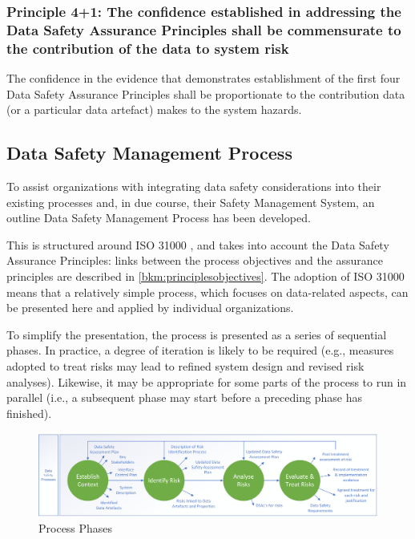 \subsubsection{Principle 4+1: The confidence established in addressing the Data Safety Assurance Principles shall be commensurate to the contribution of the data to system risk}
The confidence in the evidence that demonstrates establishment of the first four Data Safety Assurance Principles shall be proportionate to the contribution data (or a particular data artefact) makes to the system hazards.

\cbstart\subsection{Data Safety Management Process}
To assist organizations with integrating data safety considerations into their existing processes and,
in due course, their Safety Management System, an outline Data Safety Management Process has
been developed.

This is structured around ISO 31000 \cite{citation:iso310002018risk}, and takes into account the Data Safety Assurance Principles:
links between the process objectives and the assurance principles are described in \autoref{bkm:principlesobjectives}. The
adoption of ISO 31000 means that a relatively simple process, which focuses on data-related
aspects, can be presented here and applied by individual organizations.

To simplify the presentation, the process is presented as a series of sequential phases. In practice, a
degree of iteration is likely to be required (e.g., measures adopted to treat risks may lead to refined
system design and revised risk analyses). Likewise, it may be appropriate for some parts of the
process to run in parallel (i.e., a subsequent phase may start before a preceding phase has finished).
\begin{figure}[h]
\centering
\includegraphics[scale=0.45]{images/process diagram v3 Data Safety Only}
\caption{Process Phases}
\label{fig:process_phases}
\end{figure}

